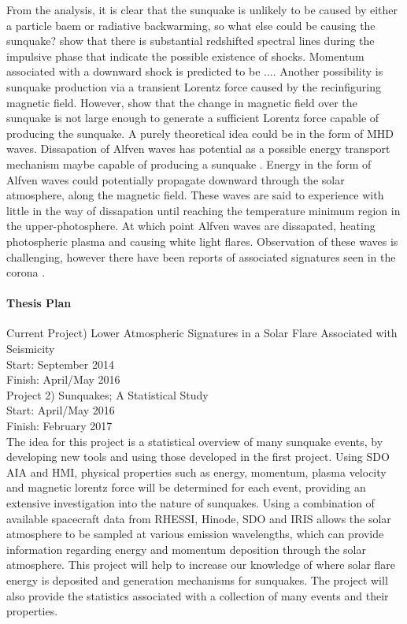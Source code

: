 From the analysis, it is clear that the sunquake is unlikely to be caused by either a particle baem or radiative backwarming, so what else could be causing the sunquake? \cite{2015ApJ...812...35M} show that there is substantial redshifted spectral lines during the impulsive phase that indicate the possible existence of shocks. Momentum associated with a downward shock is predicted to be .... Another possibility is sunquake production via a transient Lorentz force caused by the recinfiguring magnetic field. However, \cite{2014ApJ...796...85J} show that the change in magnetic field over the sunquake is not large enough to generate a sufficient Lorentz force capable of producing the sunquake. A purely theoretical idea could be in the form of MHD waves. Dissapation of Alfven waves \citep{1982SoPh...80...99E} has potential as a possible energy transport mechanism maybe capable of producing a sunquake \citep{2015ApJ...812...35M}. Energy in the form of Alfven waves could potentially propagate downward through the solar atmosphere, along the magnetic field. These waves are said to experience with little in the way of dissapation until reaching the temperature minimum region in the upper-photosphere. At which point Alfven waves are dissapated, heating photospheric plasma and causing white light flares. Observation of these waves is challenging, however there have been reports of associated signatures seen in the corona \citep{2009A&A...501L..15B}. 

\paragraph{Thesis Plan}
Current Project) Lower Atmospheric Signatures in a Solar Flare Associated with Seismicity\\
Start: September 2014\\
Finish: April/May 2016\\

Project 2) Sunquakes; A Statistical Study\\
Start: April/May 2016\\
Finish: February 2017\\

The idea for this project is a statistical overview of many sunquake events, by developing new tools and using those developed in the first project. Using SDO AIA and HMI, physical properties such as energy, momentum, plasma velocity and magnetic lorentz force will be determined for each event, providing an extensive investigation into the nature of sunquakes. Using a combination of available spacecraft data from RHESSI, Hinode, SDO and IRIS allows the solar atmosphere to be sampled at various emission wavelengths, which can provide information regarding energy and momentum deposition through the solar atmosphere. This project will help to increase our knowledge of where solar flare energy is deposited and generation mechanisms for sunquakes. The project will also provide the statistics associated with a collection of many events and their properties. 

